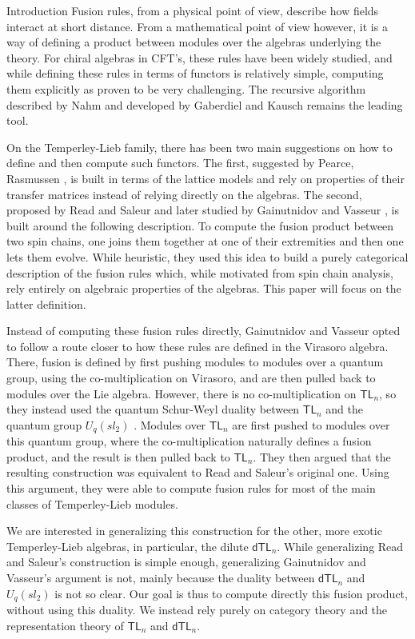 \documentclass[reqno]{amsart}
\newcommand{\dtl}[1]{\mathsf{dTL}_{#1}}
\newcommand{\tl}[1]{\mathsf{TL}_{#1}}
\begin{document}
\begin{section}{Introduction}
Fusion rules, from a physical point of view, describe how fields interact at short distance. From a mathematical point of view however, it is a way of defining a product between modules over the algebras underlying the theory. For chiral algebras in CFT's, these rules have been widely studied, and while defining these rules in terms of functors is relatively simple, computing them explicitly as proven to be very challenging. The recursive algorithm described by Nahm \cite{Nahm} and developed by Gaberdiel and Kausch \cite{GabKa} remains the leading tool. 

On the Temperley-Lieb family, there has been two main suggestions on how to define and then compute such functors. The first, suggested by Pearce, Rasmussen \cite{PeaRasm}, is built in terms of the lattice models and rely on properties of their transfer matrices instead of relying directly on the algebras. The second, proposed by Read and Saleur \cite{ReadSaleur1,ReadSaleur2} and later studied by Gainutnidov and Vasseur \cite{GainVass}, is built around the following description. To compute the fusion product between two spin chains, one joins them together at one of their extremities and then one lets them evolve. While heuristic, they used this idea to build a purely categorical description of the fusion rules which, while motivated from spin chain analysis, rely entirely on algebraic properties of the algebras. This paper will focus on the latter definition.

Instead of computing these fusion rules directly, Gainutnidov and Vasseur opted to follow a route closer to how these rules are defined in the Virasoro algebra. There, fusion is defined by first pushing modules to modules over a quantum group, using the co-multiplication on Virasoro, and are then pulled back to modules over the Lie algebra. However, there is no co-multiplication on  $\tl{n}$, so they instead used the quantum Schur-Weyl duality between $\tl{n}$ and the quantum group $U_{q}(sl_{2})$ \cite{Jimbo, SWMartin, SWCorfWeston}. Modules over $\tl{n}$ are first pushed to modules over this quantum group, where the co-multiplication naturally defines a fusion product, and the result is then pulled back to $\tl{n}$. They then argued that the resulting construction was equivalent to Read and Saleur's original one. Using this argument, they were able to compute fusion rules for most of the main classes of Temperley-Lieb modules\cite{GainVass}.

We are interested in generalizing this construction for the other, more exotic Temperley-Lieb algebras, in particular, the dilute $\dtl{n}$. While generalizing Read and Saleur's construction is simple enough, generalizing Gainutnidov and Vasseur's argument is not, mainly because the duality between $\dtl{n}$ and $U_{q}(sl_{2})$ is not so clear. Our goal is thus to compute directly this fusion product, without using this duality. We instead rely purely on category theory and the representation theory of $\tl{n}$ and $\dtl{n}$.


\end{section}
\end{document}
